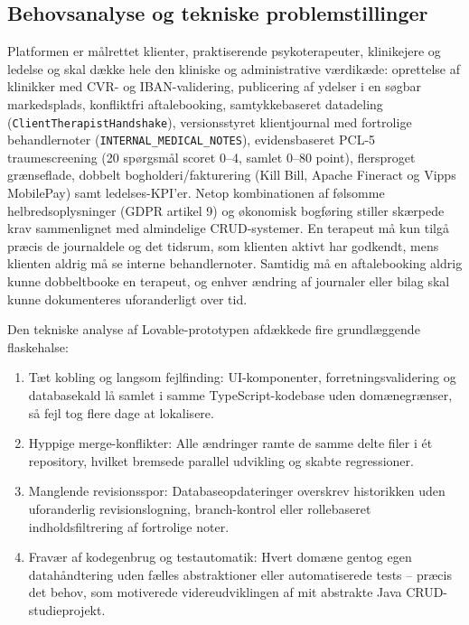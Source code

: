 \documentclass[11pt,a4paper]{article}
\begin{document}
\subsection{Behovsanalyse og tekniske problemstillinger}
Platformen er målrettet klienter, praktiserende psykoterapeuter, klinikejere og ledelse og skal dække hele den kliniske og administrative værdikæde: oprettelse af klinikker med CVR- og IBAN-validering, publicering af ydelser i en søgbar markedsplads, konfliktfri aftalebooking, samtykkebaseret datadeling (\texttt{ClientTherapistHandshake}), versionsstyret klientjournal med fortrolige behandlernoter (\texttt{INTERNAL\_MEDICAL\_NOTES}), evidensbaseret PCL-5 traumescreening (20 spørgsmål scoret 0--4, samlet 0--80 point), flersproget grænseflade, dobbelt bogholderi/fakturering (Kill Bill, Apache Fineract og Vipps MobilePay) samt ledelses-KPI'er.
\newline
Netop kombinationen af følsomme helbredsoplysninger (GDPR artikel 9) og økonomisk bogføring stiller skærpede krav sammenlignet med almindelige CRUD-systemer. En terapeut må kun tilgå præcis de journaldele og det tidsrum, som klienten aktivt har godkendt, mens klienten aldrig må se interne behandlernoter. Samtidig må en aftalebooking aldrig kunne dobbeltbooke en terapeut, og enhver ændring af journaler eller bilag skal kunne dokumenteres uforanderligt over tid.

Den tekniske analyse af Lovable-prototypen afdækkede fire grundlæggende flaskehalse:
\begin{enumerate}[noitemsep]
    \item Tæt kobling og langsom fejlfinding: UI-komponenter, forretningsvalidering og databasekald lå samlet i samme TypeScript-kodebase uden domænegrænser, så fejl tog flere dage at lokalisere.
    \item Hyppige merge-konflikter: Alle ændringer ramte de samme delte filer i ét repository, hvilket bremsede parallel udvikling og skabte regressioner.
    \item Manglende revisionsspor: Databaseopdateringer overskrev historikken uden uforanderlig revisionslogning, branch-kontrol eller rollebaseret indholdsfiltrering af fortrolige noter.
    \item Fravær af kodegenbrug og testautomatik: Hvert domæne gentog egen datahåndtering uden fælles abstraktioner eller automatiserede tests -- præcis det behov, som motiverede videreudviklingen af mit abstrakte Java CRUD-studieprojekt.
\end{enumerate}
\end{document}
